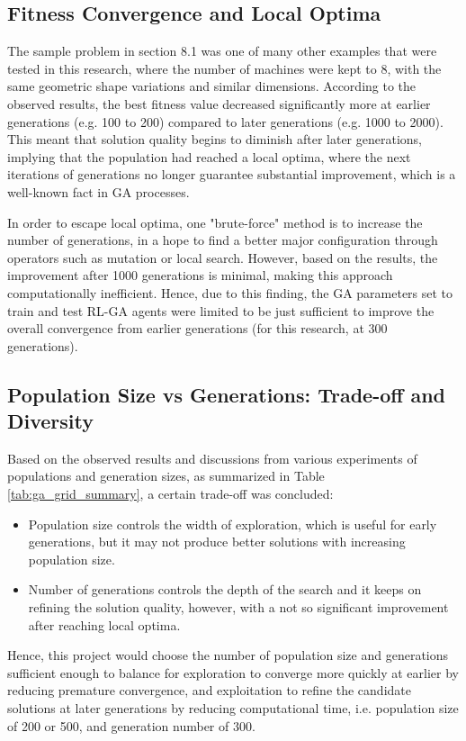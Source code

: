 \documentclass{article}
\begin{document}
\subsection{Fitness Convergence and Local Optima}
The sample problem in section 8.1 was one of many other examples that were tested in this research, where the number of machines were kept to 8, with the same geometric shape variations and similar dimensions. According to the observed results, the best fitness value decreased significantly more at earlier generations (e.g. 100 to 200) compared to later generations (e.g. 1000 to 2000). This meant that solution quality begins to diminish after later generations, implying that the population had reached a local optima, where the next iterations of generations no longer guarantee substantial improvement, which is a well-known fact in GA processes.

In order to escape local optima, one "brute-force" method is to increase the number of generations, in a hope to find a better major configuration through operators such as mutation or local search. However, based on the results, the improvement after 1000 generations is minimal, making this approach computationally inefficient. Hence, due to this finding, the GA parameters set to train and test RL-GA agents were limited to be just sufficient to improve the overall convergence from earlier generations (for this research, at 300 generations).

\subsection{Population Size vs Generations: Trade-off and Diversity}
Based on the observed results and discussions from various experiments of populations and generation sizes, as summarized in Table \ref{tab:ga_grid_summary}, a certain trade-off was concluded:
\begin{itemize}
    \item Population size controls the width of exploration, which is useful for early generations, but it may not produce better solutions with increasing population size.
    \item Number of generations controls the depth of the search and it keeps on refining the solution quality, however, with a not so significant improvement after reaching local optima.
\end{itemize}
Hence, this project would choose the number of population size and generations sufficient enough to balance for exploration to converge more quickly at earlier by reducing premature convergence, and exploitation to refine the candidate solutions at later generations by reducing computational time, i.e. population size of 200 or 500, and generation number of 300.
\end{document}
